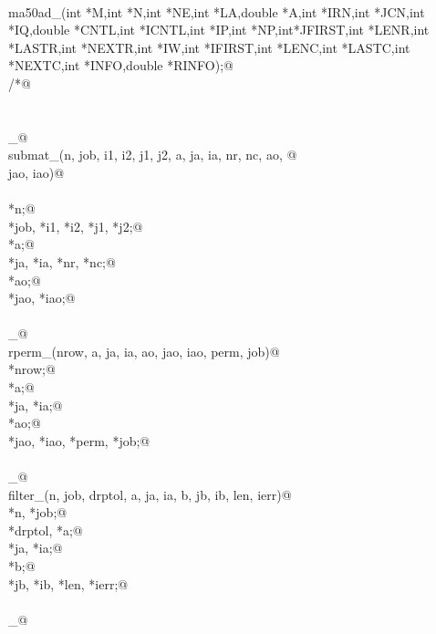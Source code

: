 \documentclass[12pt]{article}
\begin{document}
\begin{flushleft}
\begin{minipage}{\linewidth}
\begin{list}{}{}
\mbox{}\verb@@\\
\mbox{}\verb@void ma50ad_(int *M,int *N,int *NE,int *LA,double *A,int *IRN,int *JCN,int *IQ,double *CNTL,int *ICNTL,int *IP,int *NP,int*JFIRST,int *LENR,int *LASTR,int *NEXTR,int *IW,int *IFIRST,int *LENC,int *LASTC,int *NEXTC,int *INFO,double *RINFO);@\\
\mbox{}\verb@/*@\\
\mbox{}\verb@@\\
\mbox{}\verb@@\\
\mbox{}\verb@submat_@\\
\mbox{}\verb@int submat_(n, job, i1, i2, j1, j2, a, ja, ia, nr, nc, ao, @\\
\mbox{}\verb@        jao, iao)@\\
\mbox{}\verb@@\\
\mbox{}\verb@integer *n;@\\
\mbox{}\verb@integer *job, *i1, *i2, *j1, *j2;@\\
\mbox{}\verb@doublereal *a;@\\
\mbox{}\verb@integer *ja, *ia, *nr, *nc;@\\
\mbox{}\verb@doublereal *ao;@\\
\mbox{}\verb@integer *jao, *iao;@\\
\mbox{}\verb@@\\
\mbox{}\verb@rperm_@\\
\mbox{}\verb@int rperm_(nrow, a, ja, ia, ao, jao, iao, perm, job)@\\
\mbox{}\verb@integer *nrow;@\\
\mbox{}\verb@doublereal *a;@\\
\mbox{}\verb@integer *ja, *ia;@\\
\mbox{}\verb@doublereal *ao;@\\
\mbox{}\verb@integer *jao, *iao, *perm, *job;@\\
\mbox{}\verb@@\\
\mbox{}\verb@filter_@\\
\mbox{}\verb@int filter_(n, job, drptol, a, ja, ia, b, jb, ib, len, ierr)@\\
\mbox{}\verb@integer *n, *job;@\\
\mbox{}\verb@doublereal *drptol, *a;@\\
\mbox{}\verb@integer *ja, *ia;@\\
\mbox{}\verb@doublereal *b;@\\
\mbox{}\verb@integer *jb, *ib, *len, *ierr;@\\
\mbox{}\verb@@\\
\mbox{}\verb@copmat_@\\

\end{list}
\end{minipage}
\end{flushleft}
\end{document}
